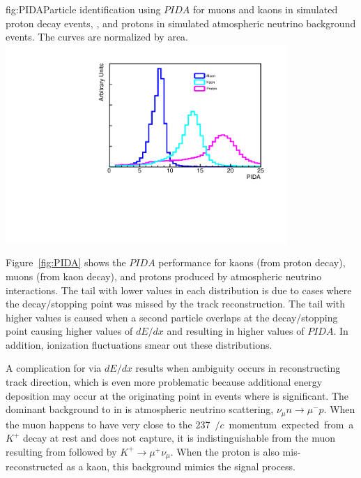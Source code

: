 \begin{dunefigure}{fig:PIDA}{Particle identification using $PIDA$ for muons and kaons in simulated proton decay events, \ptoknubar, and protons in simulated atmospheric neutrino background events.  The curves are normalized by area.}
\includegraphics[width=0.8\textwidth]{graphics/PIDA.pdf}
\end{dunefigure}

Figure~\ref{fig:PIDA} shows the $PIDA$ performance for kaons (from proton decay), muons (from kaon decay), and protons produced by atmospheric neutrino interactions. The tail with lower values in each distribution is due to cases where the decay/stopping point was missed by the track reconstruction. The tail with higher values is caused when a second particle overlaps at the decay/stopping point causing higher values of $dE/dx$ and resulting in higher values of $PIDA$. In addition, ionization fluctuations smear out these distributions.

A complication for  via $dE/dx$ results when ambiguity occurs in reconstructing track direction, which is even more problematic because additional energy deposition may occur at the originating point in events where  is significant.  The dominant background to \ptoknubar in  is atmospheric neutrino  
scattering, $\nu_{\mu} n \rightarrow \mu^{-} p$.  When the muon happens to have very close
to the \SI{237}{\MeV$/c$} momentum expected from a $K^{+}$ decay at rest and does not capture, it is indistinguishable from the muon resulting from \ptoknubar followed by $K^{+} \rightarrow \mu^{+}\nu_{\mu}$. When
the proton is also mis-reconstructed as a kaon, this background mimics the signal process.  

